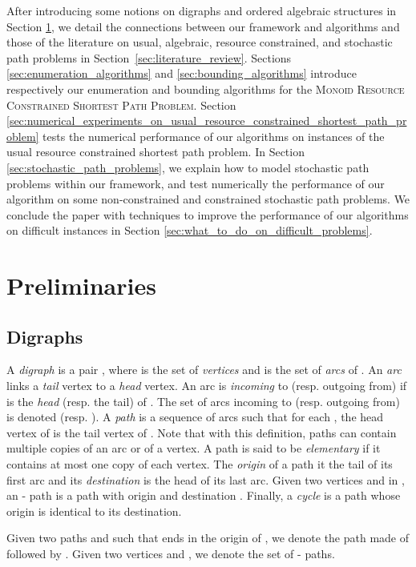 \documentclass[11pt]{amsart}
\theoremstyle{plain}
\theoremstyle{remark}
\newcommand{\MRCSP}{\textsc{Monoid Resource Constrained Shortest Path Problem}\xspace}
\begin{document}
After introducing some notions on digraphs and ordered algebraic structures in Section \ref{sec:preliminaries}, we detail the connections between our framework and algorithms and those of the literature on usual, algebraic, resource constrained, and stochastic path problems in Section~\ref{sec:literature_review}. Sections \ref{sec:enumeration_algorithms} and \ref{sec:bounding_algorithms} introduce respectively our enumeration and bounding algorithms for the \MRCSP. Section \ref{sec:numerical_experiments_on_usual_resource_constrained_shortest_path_problem} tests the numerical performance of our algorithms on instances of the usual resource constrained shortest path problem. In Section \ref{sec:stochastic_path_problems}, we explain how to model stochastic path problems within our framework, and test numerically the performance of our algorithm on some non-constrained and constrained stochastic path problems. We conclude the paper with techniques to improve the performance of our algorithms on difficult instances in Section \ref{sec:what_to_do_on_difficult_problems}.

\section{Preliminaries} \label{sec:preliminaries}

\subsection{Digraphs} \label{sub:digraphs}

A \emph{digraph}  is a pair , where  is the set of \emph{vertices} and  is the set of \emph{arcs} of . An \emph{arc}  links a \emph{tail} vertex to a \emph{head} vertex. An arc  is \emph{incoming} to (resp. outgoing from)  if  is the \emph{head} (resp. the tail) of . The set of arcs incoming to (resp. outgoing from)  is denoted  (resp. ).  A \emph{path} is a sequence of arcs  such that for each , the head vertex of  is the  tail vertex of . Note that with this definition, paths can contain multiple copies of an arc or of a vertex. A path  is said to be \emph{elementary} if it contains at most one copy of each vertex. The \emph{origin} of a path it the tail of its first arc and its \emph{destination} is the head of its last arc. Given two vertices  and  in , an - path  is a path with origin  and destination . Finally, a \emph{cycle} is a path whose origin is identical to its destination.

Given two paths  and  such that  ends in the origin of , we denote  the path made of  followed by . Given two vertices  and , we denote  the set of - paths.
\end{document}

